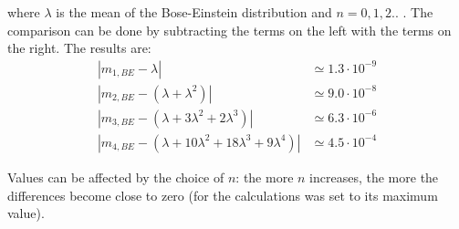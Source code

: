 where $\lambda$ is the mean of the Bose-Einstein distribution and $n=0,1,2..$ . The comparison can be done by subtracting the terms on the left with the terms on the right. The results are:
\begin{align*}
|m_{1,BE}-\lambda| &\simeq 1.3\cdot10^{-9} \\
|m_{2,BE}-(\lambda+\lambda^2)| &\simeq 9.0\cdot10^{-8} \\
|m_{3,BE}-(\lambda+3\lambda^2+2\lambda^3)| &\simeq 6.3\cdot10^{-6} \\
|m_{4,BE}-(\lambda+10\lambda^2+18\lambda^3+9\lambda^4)| &\simeq 4.5\cdot10^{-4}
\end{align*}

Values can be affected by the choice of $n$: the more $n$ increases, the more the differences become close to zero (for the calculations was set to its maximum value).